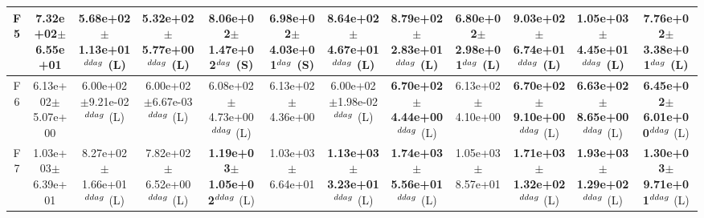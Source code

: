 \begin{table}[!t]
\begin{tabular}{c|ccccccccccc}
F5  & 7.32e+02$\pm$6.55e+01  & 5.68e+02$\pm$1.13e+01$^{\\ddag}$ (L)  & 5.32e+02$\pm$5.77e+00$^{\\ddag}$ (L)  & \textbf{8.06e+02$\pm$1.47e+02}$^{\\dag}$ (S)  & 6.98e+02$\pm$4.03e+01$^{\\dag}$ (S)  & \textbf{8.64e+02$\pm$4.67e+01}$^{\\ddag}$ (L)  & \textbf{8.79e+02$\pm$2.83e+01}$^{\\ddag}$ (L)  & 6.80e+02$\pm$2.98e+01$^{\\dag}$ (L)  & \textbf{9.03e+02$\pm$6.74e+01}$^{\\ddag}$ (L)  & \textbf{1.05e+03$\pm$4.45e+01}$^{\\ddag}$ (L)  & \textbf{7.76e+02$\pm$3.38e+01}$^{\\dag}$ (L) \\ \hline
F6  & 6.13e+02$\pm$5.07e+00  & 6.00e+02$\pm$9.21e-02$^{\\ddag}$ (L)  & 6.00e+02$\pm$6.67e-03$^{\\ddag}$ (L)  & 6.08e+02$\pm$4.73e+00$^{\\ddag}$ (L)  & 6.13e+02$\pm$4.36e+00   & 6.00e+02$\pm$1.98e-02$^{\\ddag}$ (L)  & \textbf{6.70e+02$\pm$4.44e+00}$^{\\ddag}$ (L)  & 6.13e+02$\pm$4.10e+00   & \textbf{6.70e+02$\pm$9.10e+00}$^{\\ddag}$ (L)  & \textbf{6.63e+02$\pm$8.65e+00}$^{\\ddag}$ (L)  & \textbf{6.45e+02$\pm$6.01e+00}$^{\\ddag}$ (L) \\ \hline
F7  & 1.03e+03$\pm$6.39e+01  & 8.27e+02$\pm$1.66e+01$^{\\ddag}$ (L)  & 7.82e+02$\pm$6.52e+00$^{\\ddag}$ (L)  & \textbf{1.19e+03$\pm$1.05e+02}$^{\\ddag}$ (L)  & 1.03e+03$\pm$6.64e+01   & \textbf{1.13e+03$\pm$3.23e+01}$^{\\ddag}$ (L)  & \textbf{1.74e+03$\pm$5.56e+01}$^{\\ddag}$ (L)  & 1.05e+03$\pm$8.57e+01   & \textbf{1.71e+03$\pm$1.32e+02}$^{\\ddag}$ (L)  & \textbf{1.93e+03$\pm$1.29e+02}$^{\\ddag}$ (L)  & \textbf{1.30e+03$\pm$9.71e+01}$^{\\ddag}$ (L) \\ \hline

\end{tabular}
\end{table}
